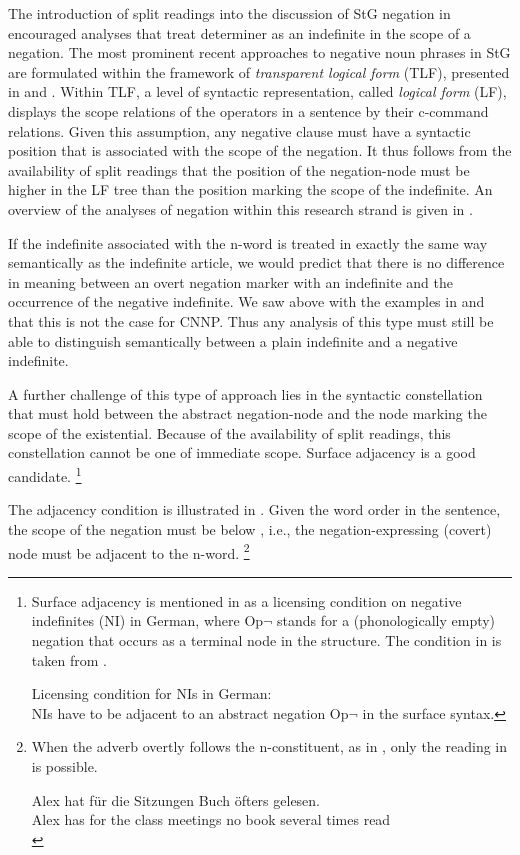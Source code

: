 \documentclass[output=paper]{langsci/langscibook}
\begin{document}
The introduction of split readings into the discussion of StG negation in \citet{Jacobs:80} encouraged analyses that treat determiner  as an indefinite  in the scope of a negation. 
%
The most prominent recent approaches to negative noun phrases in StG are formulated within the framework of \emph{transparent logical form} (TLF), presented in \citet{Stechow:93}  and \citet{Heim:Kratzer:98}.
Within TLF, a level of syntactic representation, called \emph{logical form} (LF), displays the scope relations of the operators in a sentence by their c-command relations. 
Given this assumption, any negative clause must have a syntactic position that is associated with the scope of the negation. 
It thus follows from the availability of split readings that the position of the negation-node must be higher in the LF tree than the position marking the scope of the indefinite. 
An overview of the analyses of negation within this research strand is given in \citet{Zeijlstra:16}.

If the indefinite associated with the n-word is treated in exactly the same way semantically as the indefinite article, we would predict that there is no difference in meaning between an overt negation marker with an indefinite and the occurrence of the negative indefinite. We saw above with the examples in  and  that this is not the case for CNNP. Thus any analysis of this type must still be able to distinguish semantically between a plain indefinite and a negative indefinite.

A further challenge of this type of approach lies in the syntactic constellation that must hold between the abstract negation-node and the node marking the scope of the existential.
Because of the availability of split readings, this constellation cannot be one of immediate scope. Surface adjacency is a good candidate.%
\footnote{Surface adjacency is mentioned in \citet{Penka:11} as a licensing condition on negative indefinites (NI) in German, where Op$\lnot$ stands for a (phonologically empty) negation that occurs as a terminal node in the structure. The condition in  is taken from \citet[112]{Penka:11}.

\ea \label{penka-adjacent}
Licensing condition for NIs in German:\\
NIs have to be adjacent to an abstract negation Op$\lnot$ in the surface syntax.
\z}

The adjacency condition is illustrated in . Given the word order in the sentence, the scope of the negation must be below , i.e., the negation-expressing (covert) node 
must be adjacent to the n-word.%
\footnote{When the adverb overtly follows the n-constituent, as in
  , only the reading in  is
  possible.
  
\ea \label{not-often}
\gll Alex hat für die Sitzungen  Buch öfters gelesen.\\
Alex has for the {class meetings} no book {several times} read\\
\z}
\end{document}
